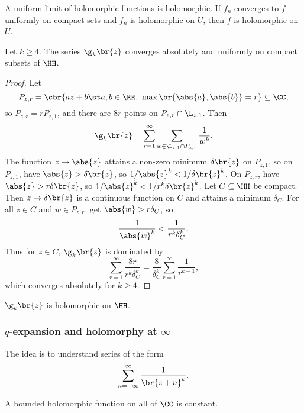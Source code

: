 \begin{theorem}
A uniform limit of holomorphic functions is holomorphic. If $ f_n $ converges to $ f $ uniformly on compact sets and $ f_n $ is holomorphic on $ U $, then $ f $ is holomorphic on $ U $.
\end{theorem}

\begin{theorem}
Let $ k \ge 4 $. The series $ \g_k\br{z} $ converges absolutely and uniformly on compact subsets of $ \HH $.
\end{theorem}

\begin{proof}
Let
$$ P_{z, r} = \cbr{az + b \st a, b \in \RR, \ \max\br{\abs{a}, \abs{b}} = r} \subseteq \CC, $$
so $ P_{z, r} = rP_{z, 1} $, and there are $ 8r $ points on $ P_{z, r} \cap \L_{z, 1} $. Then
$$ \g_k\br{z} = \sum_{r = 1}^\infty \sum_{w \in \L_{z, 1} \cap P_{z, r}} \dfrac{1}{w^k}. $$
The function $ z \mapsto \abs{z} $ attains a non-zero minimum $ \delta\br{z} $ on $ P_{z, 1} $, so on $ P_{z, 1} $, have $ \abs{z} > \delta\br{z} $, so $ 1 / \abs{z}^k < 1 / \delta\br{z}^k $. On $ P_{z, r} $, have $ \abs{z} > r\delta\br{z} $, so $ 1 / \abs{z}^k < 1 / r^k\delta\br{z}^k $. Let $ C \subseteq \HH $ be compact. Then $ z \mapsto \delta\br{z} $ is a continuous function on $ C $ and attains a minimum $ \delta_C $. For all $ z \in C $ and $ w \in P_{z, r} $, get $ \abs{w} > r\delta_C $, so
$$ \dfrac{1}{\abs{w}^k} < \dfrac{1}{r^k\delta_C^k}. $$
Thus for $ z \in C $, $ \g_k\br{z} $ is dominated by
$$ \sum_{r = 1}^\infty \dfrac{8r}{r^k\delta_C^k} = \dfrac{8}{\delta_C^k}\sum_{r = 1}^\infty \dfrac{1}{r^{k - 1}}, $$
which converges absolutely for $ k \ge 4 $.
\end{proof}

\begin{corollary}
$ \g_k\br{z} $ is holomorphic on $ \HH $.
\end{corollary}

\pagebreak

\subsubsection{\texorpdfstring{$ q $}{q}-expansion and holomorphy at \texorpdfstring{$ \infty $}{infinity}}

The idea is to understand series of the form
$$ \sum_{n = -\infty}^\infty \dfrac{1}{\br{z + n}^k}. $$

\begin{theorem}
A bounded holomorphic function on all of $ \CC $ is constant.
\end{theorem}

